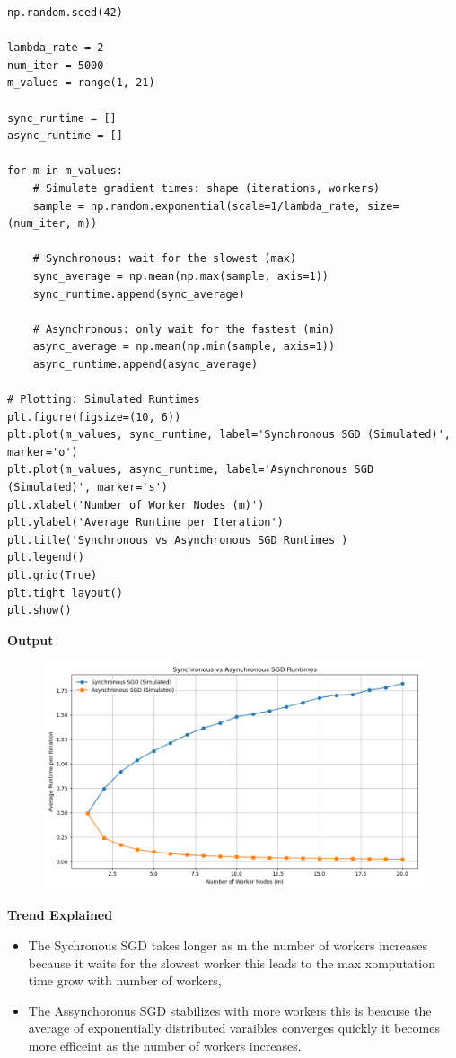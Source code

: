 \documentclass{article}
\begin{document}
\begin{enumerate}
\begin{verbatim}
np.random.seed(42)

lambda_rate = 2
num_iter = 5000
m_values = range(1, 21)

sync_runtime = []
async_runtime = []

for m in m_values:
    # Simulate gradient times: shape (iterations, workers)
    sample = np.random.exponential(scale=1/lambda_rate, size=(num_iter, m))

    # Synchronous: wait for the slowest (max)
    sync_average = np.mean(np.max(sample, axis=1))
    sync_runtime.append(sync_average)

    # Asynchronous: only wait for the fastest (min)
    async_average = np.mean(np.min(sample, axis=1))
    async_runtime.append(async_average)

# Plotting: Simulated Runtimes
plt.figure(figsize=(10, 6))
plt.plot(m_values, sync_runtime, label='Synchronous SGD (Simulated)', marker='o')
plt.plot(m_values, async_runtime, label='Asynchronous SGD (Simulated)', marker='s')
plt.xlabel('Number of Worker Nodes (m)')
plt.ylabel('Average Runtime per Iteration')
plt.title('Synchronous vs Asynchronous SGD Runtimes')
plt.legend()
plt.grid(True)
plt.tight_layout()
plt.show()       
    \end{verbatim}

    \textbf{Output}
    \begin{figure}[H]
        \centering
        \includegraphics[width=1\textwidth]{SGD_simulation.png}
        \label{fig:sgd_runtimes}
    \end{figure}

    \textbf{Trend Explained}\\
    \begin{itemize}
        \item The Sychronous SGD takes longer as m the number of workers increases because it waits for the slowest worker this leads to the max xomputation time grow with number of workers,
        \item The Assynchoronus SGD stabilizes with more workers this is beacuse the average of exponentially distributed varaibles converges quickly it becomes more efficeint as the number of workers increases.
    \end{itemize}


\end{enumerate}
\end{document}

